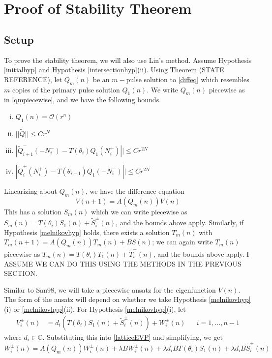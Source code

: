 \documentclass[12pt]{article}
\def\C{{\mathbb C}}
\begin{document}
\section{Proof of Stability Theorem}

\subsection{Setup}
To prove the stability theorem, we will also use Lin's method. Assume Hypothesis \ref{initialhyp} and Hypothesis \ref{intersectionhyp}(ii). Using Theorem (STATE REFERENCE), let $Q_m(n)$ be an $m-$pulse solution to \eqref{diffeq} which resembles $m$ copies of the primary pulse solution $Q_1(n)$. We write $Q_m(n)$ piecewise as in \eqref{qmpiecewise}, and we have the following bounds.
\begin{enumerate}[(i)]
\item $Q_1(n) = \mathcal{O}(r^n)$
\item $||\tilde{Q}|| \leq C r^N$
\item $|\tilde{Q}_{i+1}^-(-N_i^-) - T(\theta_i) Q_1(N_i^+)|| \leq C r^{2N}$ 
\item $|\tilde{Q}_i^+(N_i^+) - T(\theta_{i+1}) Q_1(-N_i^-)|| \leq C r^{2N}$
\end{enumerate}

Linearizing about $Q_m(n)$, we have the difference equation
\[
V(n+1) = A(Q_m(n))V(n)
\]
This has a solution $S_m(n)$ which we can write piecewise as $S_m(n) = T(\theta_i) S_1(n) + \tilde{S}_i^\pm(n)$, and the bounds above apply. Similarly, if Hypothesis \ref{melnikovhyp} holds, there exists a solution $T_m(n)$ with $T_m(n+1) = A(Q_m(n))T_m(n) + BS(n)$; we can again write $T_m(n)$ piecewise as $T_m(n) = T(\theta_i) T_1(n) + \tilde{T}_i^\pm(n)$, and the bounds above apply. I ASSUME WE CAN DO THIS USING THE METHODS IN THE PREVIOUS SECTION.

Similar to San98, we will take a piecewise ansatz for the eigenfunction $V(n)$. The form of the ansatz will depend on whether we take Hypothesis \ref{melnikovhyp}(i) or \ref{melnikovhyp}(ii). For Hypothesis \ref{melnikovhyp}(i), let
\begin{align*}
V_i^\pm(n) &= d_i ( T(\theta_i) S_1(n) + \tilde{S}_i^\pm(n) ) + W_i^\pm(n)
&& i = 1, \dots, n-1
\end{align*}
where $d_i \in \C$. Substituting this into \eqref{latticeEVP} and simplifying, we get
\[
W_i^\pm(n) = A(Q_m(n)) W_i^\pm(n) + \lambda B W_i^\pm(n) + \lambda d_i B T(\theta_i) S_1(n) + \lambda d_i B \tilde{S}_i^\pm(n)
\]
\end{document}
